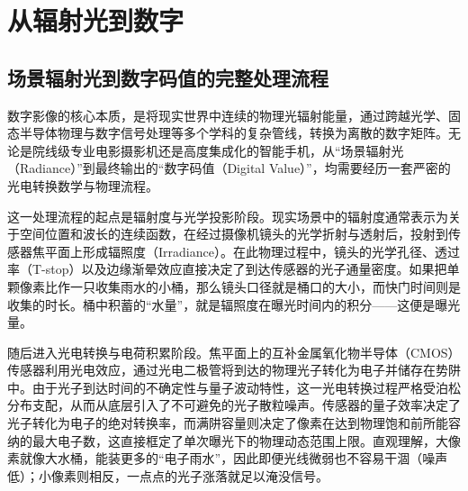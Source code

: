 \documentclass[12pt, a4paper]{ctexart}
\begin{document}
\vfill

\newpage
{}
{} %
\renewcommand{\contentsname}{\centering\heiti\zihao{3} 目\quad 录}
\tableofcontents


\newpage
{} %
\renewcommand{\thepage}{\ifnum\value{page}<10 0\arabic{page}\else\arabic{page}\fi} %

\section{从辐射光到数字}

\subsection{场景辐射光到数字码值的完整处理流程}

数字影像的核心本质，是将现实世界中连续的物理光辐射能量，通过跨越光学、固态半导体物理与数字信号处理等多个学科的复杂管线，转换为离散的数字矩阵。无论是院线级专业电影摄影机还是高度集成化的智能手机，从“场景辐射光（Radiance）”到最终输出的“数字码值（Digital Value）”，均需要经历一套严密的光电转换数学与物理流程。

这一处理流程的起点是辐射度与光学投影阶段。现实场景中的辐射度通常表示为关于空间位置和波长的连续函数，在经过摄像机镜头的光学折射与透射后，投射到传感器焦平面上形成辐照度（Irradiance）。在此物理过程中，镜头的光学孔径、透过率（T-stop）以及边缘渐晕效应直接决定了到达传感器的光子通量密度。如果把单颗像素比作一只收集雨水的小桶，那么镜头口径就是桶口的大小，而快门时间则是收集的时长。桶中积蓄的“水量”，就是辐照度在曝光时间内的积分——这便是曝光量。

随后进入光电转换与电荷积累阶段。焦平面上的互补金属氧化物半导体（CMOS）传感器利用光电效应，通过光电二极管将到达的物理光子转化为电子并储存在势阱中。由于光子到达时间的不确定性与量子波动特性，这一光电转换过程严格受泊松分布支配，从而从底层引入了不可避免的光子散粒噪声。传感器的量子效率决定了光子转化为电子的绝对转换率，而满阱容量则决定了像素在达到物理饱和前所能容纳的最大电子数，这直接框定了单次曝光下的物理动态范围上限。直观理解，大像素就像大水桶，能装更多的“电子雨水”，因此即便光线微弱也不容易干涸（噪声低）；小像素则相反，一点点的光子涨落就足以淹没信号。
\end{document}
